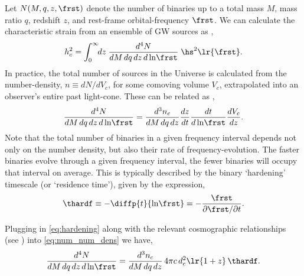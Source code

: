         Let $N(M,q,z,\frst)$ denote the number of binaries up to a total mass $M$, mass ratio $q$, redshift $z$, and rest-frame orbital-frequency $\frst$.
        We can calculate the characteristic strain from an ensemble of GW sources as \citep[][Eqs.~5/8]{Phinney-2001},
            \begin{align}
                h_c^2 = \int_0^\infty \!\! dz \; \frac{d^4 N}{dM \, dq \, dz \, d\ln\!\frst} \; \hs^2\lr{\frst}.
            \end{align}
        In practice, the total number of sources in the Universe is calculated from the number-density, $n \equiv dN / dV_c$, for some comoving volume $V_c$, extrapolated into an observer's entire past light-cone.  These can be related as \citep[][Eq.~6]{Sesana+2008},
            \begin{align}
                \label{eq:num_num_dens}
                \frac{d^4 N}{dM \, dq \, dz \, d\ln\!\frst} = \frac{d^3 n_c}{dM \, dq \, dz} \frac{dz}{dt} \frac{dt}{d\ln\!\frst} \frac{d V_c}{dz}.
            \end{align}
        Note that the total number of binaries in a given frequency interval depends not only on the number density, but also their rate of frequency-evolution.  The faster binaries evolve through a given frequency interval, the fewer binaries will occupy that interval on average.  This is typically described by the binary `hardening' timescale (or `residence time'), given by the expression,
        \begin{equation}
            \label{eq:hardening}
            \thardf \equiv - \diffp{t}{{\ln\!\frst}} = - \frac{\frst}{\partial \frst / \partial t}.
        \end{equation}


        Plugging in \eqref{eq:hardening} along with the relevant cosmographic relationships (see ) into \eqref{eq:num_num_dens} we have,
        \begin{equation}
            \frac{d^4 N}{dM \, dq \, dz \, d\ln\!\frst} =
                \frac{d^3 n_c}{dM \, dq \, dz} \, 4\pi c \, d_c^2 \lr{1+z} \, \thardf.
        \end{equation}



